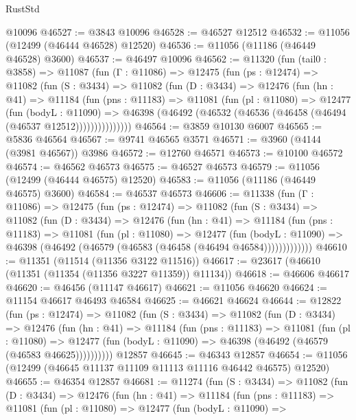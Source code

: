 \begin{lexlean}{RustStd}
\begin{coremodule}
    @10096
@46527 := @3843 @10096
@46528 := @46527 @12512
@46532 := @11056 (@12499 (@46444 @46528) @12520)
@46536 := @11056 (@11186 (@46449 @46528) @3600)
@46537 := @46497 @10096
@46562 := @11320
    (fun (tail0 : @3858) =>
    @11087
      (fun (Γ : @11086) =>
      @12475
        (fun (ps : @12474) =>
        @11082
          (fun (S : @3434) =>
          @11082
            (fun (D : @3434) =>
            @12476
              (fun (hn : @41) =>
              @11184
                (fun (pns : @11183) =>
                @11081
                  (fun (pl : @11080) =>
                  @12477
                    (fun (bodyL : @11090) =>
                    @46398 (@46492 (@46532 (@46536 (@46458 (@46494 (@46537 @12512)))))))))))))))
@46564 := @3859 @10130 @6007
@46565 := @5836 @46564
@46567 := @9741 @46565 @3571
@46571 := @3960 (@4144 (@3981 @46567)) @3986
@46572 := @12760 @46571
@46573 := @10100 @46572
@46574 := @46562 @46573
@46575 := @46527 @46573
@46579 := @11056 (@12499 (@46444 @46575) @12520)
@46583 := @11056 (@11186 (@46449 @46575) @3600)
@46584 := @46537 @46573
@46606 := @11338
    (fun (Γ : @11086) =>
    @12475
      (fun (ps : @12474) =>
      @11082
        (fun (S : @3434) =>
        @11082
          (fun (D : @3434) =>
          @12476
            (fun (hn : @41) =>
            @11184
              (fun (pns : @11183) =>
              @11081
                (fun (pl : @11080) =>
                @12477
                  (fun (bodyL : @11090) =>
                  @46398 (@46492 (@46579 (@46583 (@46458 (@46494 @46584)))))))))))))
@46610 := @11351 (@11514 (@11356 @3122 @11516))
@46617 := @23617 (@46610 (@11351 (@11354 (@11356 @3227 @11359)) @11134))
@46618 := @46606 @46617
@46620 := @46456 (@11147 @46617)
@46621 := @11056 @46620
@46624 := @11154 @46617 @46493 @46584
@46625 := @46621 @46624
@46644 := @12822
    (fun (ps : @12474) =>
    @11082
      (fun (S : @3434) =>
      @11082
        (fun (D : @3434) =>
        @12476
          (fun (hn : @41) =>
          @11184
            (fun (pns : @11183) =>
            @11081
              (fun (pl : @11080) =>
              @12477 (fun (bodyL : @11090) => @46398 (@46492 (@46579 (@46583 @46625))))))))))
    @12857
@46645 := @46343 @12857
@46654 := @11056 (@12499 (@46645 @11137 @11109 @11113 @11116 @46442 @46575) @12520)
@46655 := @46354 @12857
@46681 := @11274
    (fun (S : @3434) =>
    @11082
      (fun (D : @3434) =>
      @12476
        (fun (hn : @41) =>
        @11184
          (fun (pns : @11183) =>
          @11081
            (fun (pl : @11080) =>
            @12477
              (fun (bodyL : @11090) =>

\end{coremodule}
\end{lexlean}
